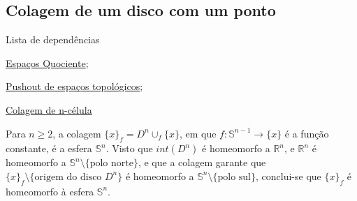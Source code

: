\subsection{Colagem de um disco com um ponto} %
\label{colagem-de-um-disco-com-um-ponto-ex}
\begin{titlemize}{Lista de dependências}
	\item \hyperref[topologia-quociente-def]{Espaços Quociente};\\
    \item \hyperref[pushout-de-espacos-topologicos-def]{Pushout de espaços topológicos};\\
    \item \hyperref[colagem-de-n-celula-def]{Colagem de n-célula}%
\end{titlemize}

\begin{ex}
    Para $n\ge 2$, a colagem $\{x\}_f=D^n\cup_f \{x\}$, em que $f:\mathbb{S}^{n-1}\rightarrow \{x\}$ é a função constante, é a esfera $\mathbb{S}^n$. Visto que $int(D^n)$ é homeomorfo a $\mathbb{R}^n$, e $\mathbb{R}^n$ é homeomorfo a $\mathbb{S}^n\setminus\{\text{polo norte}\}$, e que a colagem garante que $\{x\}_f\setminus\{\text{origem do disco }D^n \}$ é homeomorfo a $\mathbb{S}^n\setminus\{\text{polo sul}\}$, conclui-se que $\{x\}_f$ é homeomorfo à esfera $\mathbb{S}^n$.
\end{ex}


